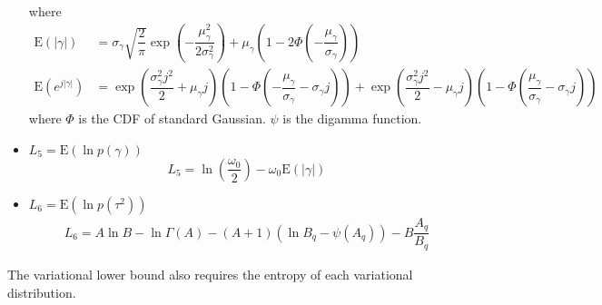 \documentclass[12pt]{article}
\begin{document}
\begin{itemize}
    where
    \begin{align}
      \mathrm{E}\left(\left|\gamma\right|\right) &= \sigma_{\gamma}\sqrt{\dfrac{2}{\pi}}\exp\left(-\dfrac{\mu_{\gamma}^{2}}{2\sigma_{\gamma}^{2}}\right)+\mu_{\gamma}\left(1-2\Phi\left(-\dfrac{\mu_{\gamma}}{\sigma_{\gamma}}\right)\right)\\
      \mathrm{E}\left(e^{j\left|\gamma\right|}\right) &= \exp\left(\dfrac{\sigma_{\gamma}^{2}j^{2}}{2}+\mu_{\gamma}j\right)\left(1-\Phi\left(-\dfrac{\mu_{\gamma}}{\sigma_{\gamma}}-\sigma_{\gamma}j\right)\right)+\exp\left(\dfrac{\sigma_{\gamma}^{2}j^{2}}{2}-\mu_{\gamma}j\right)\left(1-\Phi\left(\dfrac{\mu_{\gamma}}{\sigma_{\gamma}}-\sigma_{\gamma}j\right)\right)
    \end{align}
    where $\Phi$ is the CDF of standard Gaussian. $\psi$ is the digamma function.
    \item $L_{5} = \mathrm{E}\left(\ln p\left(\gamma\right)\right)$
    \begin{equation}
      L_{5} = \ln\left(\dfrac{\omega_{0}}{2}\right)-\omega_{0}\mathrm{E}\left(\left|\gamma\right|\right)
    \end{equation}
    \item $L_{6}=\mathrm{E}\left(\ln p\left(\tau^{2}\right)\right)$
    \begin{align}
      L_{6} = A\ln B -\ln\Gamma\left(A\right)-\left(A+1\right)\left(\ln B_{q}-\psi\left(A_{q}\right)\right)-B\dfrac{A_{q}}{B_{q}}
    \end{align}
  \end{itemize}
  The variational lower bound also requires the entropy of each variational distribution.
\end{document}
